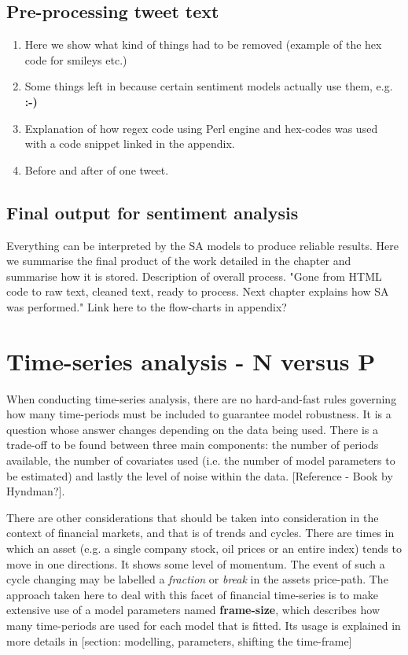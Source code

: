 \documentclass{article}
\begin{document}
\subsection{Pre-processing tweet text}
\label{sec-3-5}
\begin{enumerate}
\item Here we show what kind of things had to be removed (example of the hex code for smileys etc.)
\item Some things left in because certain sentiment models actually use them, e.g. \textbf{:-)}
\item Explanation of how regex code using Perl engine and hex-codes was used with a code snippet linked in the appendix.
\item Before and after of one tweet.
\end{enumerate}


\subsection{Final output for sentiment analysis}
\label{sec-3-6}
Everything can be interpreted by the SA models to produce reliable results.
Here we summarise the final product of the work detailed in the chapter and summarise how it is stored. Description of overall process. "Gone from HTML code to raw text, cleaned text, ready to process. Next chapter explains how SA was performed."
Link here to the flow-charts in appendix?



\section{Time-series analysis - N versus P}
\label{sec-4}
When conducting time-series analysis, there are no hard-and-fast rules governing how many time-periods must be included to guarantee model robustness. It is a question whose answer changes depending on the data being used. There is a trade-off to be found between three main components: the number of periods available, the number of covariates used (i.e. the number of model parameters to be estimated) and lastly the level of noise within the data. [Reference - Book by Hyndman?].

There are other considerations that should be taken into consideration in the context of financial markets, and that is of trends and cycles. There are times in which an asset (e.g. a single company stock, oil prices or an entire index) tends to move in one directions. It shows some level of momentum. The event of such a cycle changing may be labelled a \emph{fraction} or \emph{break} in the assets price-path. The approach taken here to deal with this facet of financial time-series is to make extensive use of a model parameters named \textbf{frame-size}, which describes how many time-periods are used for each model that is fitted. Its usage is explained in more details in [section: modelling, parameters, shifting the time-frame]
\end{document}
